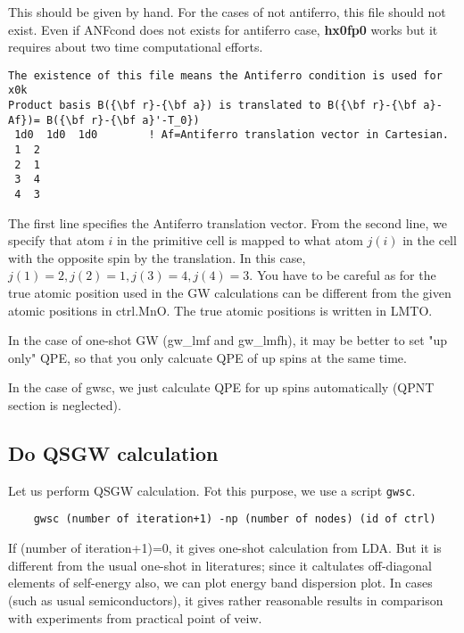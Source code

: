 \documentclass[a4paper,10pt,epsf,fleqn]{article}
\begin{document}
This should be given by hand. For the cases of not antiferro,
this file should not exist. Even if {\sf ANFcond } 
does not exists for antiferro case, {\bf hx0fp0} works but it 
requires about two time computational efforts.


{\baselineskip=2.6mm \small
\begin{verbatim} 
The existence of this file means the Antiferro condition is used for x0k
Product basis B({\bf r}-{\bf a}) is translated to B({\bf r}-{\bf a}-Af})= B({\bf r}-{\bf a}'-T_0})
 1d0  1d0  1d0        ! Af=Antiferro translation vector in Cartesian.
 1  2
 2  1
 3  4
 4  3
\end{verbatim}}
The first line specifies the Antiferro translation vector.
From the second line, we specify that atom $i$ in the primitive cell
is mapped to what atom $j(i)$ in the cell with the opposite spin by
the translation. In this case, $j(1)=2, j(2)=1,j(3)=4, j(4)=3$.
You have to be careful as for the true atomic position used in 
the GW calculations can be different from the given atomic positions in
{\sf ctrl.MnO}. The true atomic positions is written in {\sf LMTO}.


In the case of one-shot GW (gw\_lmf and gw\_lmfh),
it may be better to set "up only" QPE,
so that you only calcuate QPE of up spins at the same time.

In the case of gwsc, we just calculate QPE for up spins
automatically (QPNT section is neglected).



\subsection{Do QSGW calculation}
\label{fpgw-calc}
Let us perform QSGW calculation. 
Fot this purpose, we use a script \verb+gwsc+. 
\begin{verbatim}
    gwsc (number of iteration+1) -np (number of nodes) (id of ctrl)
\end{verbatim}
If (number of iteration+1)=0, it gives one-shot calculation from LDA.
But it is different from the usual one-shot in literatures;
since it caltulates off-diagonal elements of self-energy also,
we can plot energy band dispersion plot. In cases (such as usual
semiconductors), it gives rather reasonable results in comparison with
experiments from practical point of veiw.
\end{document}
